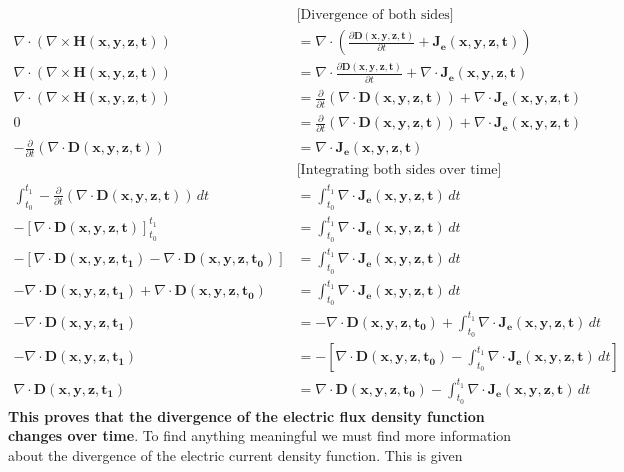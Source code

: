 \begin{align*}
  & \text{[Divergence of both sides]} \\
  \nabla \cdot (\nabla \times \mathbf{H(x,y,z,t)}) &= \nabla \cdot \left(\frac{\partial \mathbf{D(x,y,z,t)}}{\partial t} + \mathbf{J_e(x,y,z,t)}\right) \\
  \nabla \cdot (\nabla \times \mathbf{H(x,y,z,t)}) &= \nabla \cdot \frac{\partial \mathbf{D(x,y,z,t)}}{\partial t} + \nabla \cdot \mathbf{J_e(x,y,z,t)} \\
  \nabla \cdot (\nabla \times \mathbf{H(x,y,z,t)}) &= \frac{\partial}{\partial t} (\nabla \cdot \mathbf{D(x,y,z,t)}) + \nabla \cdot \mathbf{J_e(x,y,z,t)} \\
  0 &= \frac{\partial}{\partial t} (\nabla \cdot \mathbf{D(x,y,z,t)}) + \nabla \cdot \mathbf{J_e(x,y,z,t)} \\
  - \frac{\partial}{\partial t} (\nabla \cdot \mathbf{D(x,y,z,t)}) &= \nabla \cdot \mathbf{J_e(x,y,z,t)} \\
  & \text{[Integrating both sides over time]} \\
  \int_{t_0}^{t_1} - \frac{\partial}{\partial t} (\nabla \cdot \mathbf{D(x,y,z,t)}) \, dt &= \int_{t_0}^{t_1} \nabla \cdot \mathbf{J_e(x,y,z,t)} \, dt \\
  - \left[\nabla \cdot \mathbf{D(x,y,z,t)}\right]_{t_0}^{t_1} &= \int_{t_0}^{t_1} \nabla \cdot \mathbf{J_e(x,y,z,t)} \, dt \\
  - \left[\nabla \cdot \mathbf{D(x,y,z,t_1)} - \nabla \cdot \mathbf{D(x,y,z,t_0)}\right] &= \int_{t_0}^{t_1} \nabla \cdot \mathbf{J_e(x,y,z,t)} \, dt \\
  - \nabla \cdot \mathbf{D(x,y,z,t_1)} + \nabla \cdot \mathbf{D(x,y,z,t_0)} &=  \int_{t_0}^{t_1} \nabla \cdot \mathbf{J_e(x,y,z,t)} \, dt \\
  - \nabla \cdot \mathbf{D(x,y,z,t_1)} &= - \nabla \cdot \mathbf{D(x,y,z,t_0)} + \int_{t_0}^{t_1} \nabla \cdot \mathbf{J_e(x,y,z,t)} \, dt \\
  - \nabla \cdot \mathbf{D(x,y,z,t_1)} &= - \left[\nabla \cdot \mathbf{D(x,y,z,t_0)} - \int_{t_0}^{t_1} \nabla \cdot \mathbf{J_e(x,y,z,t)} \, dt \right] \\
  \nabla \cdot \mathbf{D(x,y,z,t_1)} &= \nabla \cdot \mathbf{D(x,y,z,t_0)} - \int_{t_0}^{t_1} \nabla \cdot \mathbf{J_e(x,y,z,t)} \, dt
\end{align*}
\textbf{This proves that the divergence of the electric flux density function
changes over time}. To find anything meaningful we must find more information
about the divergence of the electric current density function. This is given
